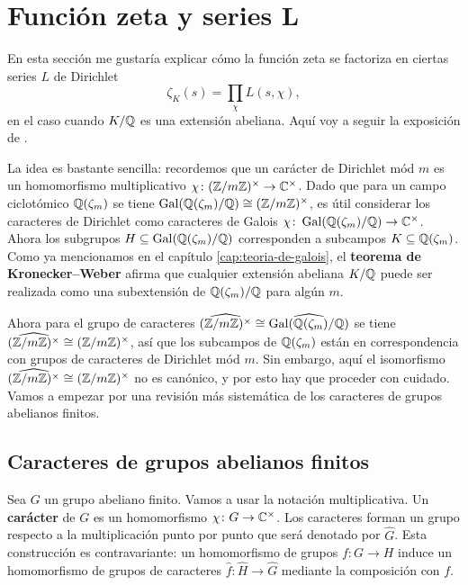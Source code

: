 \section{Función zeta y series L}

En esta sección me gustaría explicar cómo la función zeta se factoriza en
ciertas series $L$ de Dirichlet
$$\zeta_K (s) = \prod_\chi L(s,\chi),$$
en el caso cuando $K/\mathbb{Q}$ es una extensión abeliana. Aquí voy a seguir la
exposición de \cite{Washington-GTM83}.

La idea es bastante sencilla: recordemos que un carácter de Dirichlet mód $m$
es un homomorfismo multiplicativo
$\chi\colon (\mathbb{Z}/m\mathbb{Z})^\times \to \mathbb{C}^\times$. Dado que para un campo ciclotómico
$\mathbb{Q} (\zeta_m)$ se tiene $\operatorname{Gal} (\mathbb{Q}(\zeta_m)/\mathbb{Q}) \cong (\mathbb{Z}/m\mathbb{Z})^\times$,
es útil considerar los caracteres de Dirichlet como caracteres de Galois
$\chi\colon \operatorname{Gal} (\mathbb{Q}(\zeta_m)/\mathbb{Q}) \to \mathbb{C}^\times$. Ahora los subgrupos
$H \subseteq \operatorname{Gal} (\mathbb{Q}(\zeta_m)/\mathbb{Q})$ corresponden a subcampos
$K \subseteq \mathbb{Q} (\zeta_m)$. Como ya mencionamos en el capítulo
\ref{cap:teoria-de-galois}, el \textbf{teorema de Kronecker--Weber} afirma que
cualquier extensión abeliana $K/\mathbb{Q}$ puede ser realizada como una subextensión
de $\mathbb{Q} (\zeta_m)/\mathbb{Q}$ para algún $m$.

Ahora para el grupo de caracteres
$\widehat{(\mathbb{Z}/m\mathbb{Z})^\times} \cong \widehat{\operatorname{Gal} (\mathbb{Q}(\zeta_m)/\mathbb{Q})}$ se tiene
$\widehat{(\mathbb{Z}/m\mathbb{Z})^\times} \cong (\mathbb{Z}/m\mathbb{Z})^\times$, así que los subcampos
de $\mathbb{Q} (\zeta_m)$ están en correspondencia con grupos de caracteres de
Dirichlet mód $m$. Sin embargo, aquí el isomorfismo
$\widehat{(\mathbb{Z}/m\mathbb{Z})^\times} \cong (\mathbb{Z}/m\mathbb{Z})^\times$ no es canónico, y por esto
hay que proceder con cuidado. Vamos a empezar por una revisión más
sistemática de los caracteres de grupos abelianos finitos.


\subsection{Caracteres de grupos abelianos finitos}

Sea $G$ un grupo abeliano finito. Vamos a usar la notación multiplicativa.
Un \textbf{carácter} de $G$ es un homomorfismo $\chi\colon G\to \mathbb{C}^\times$.
Los caracteres forman un grupo respecto a la multiplicación punto por punto
que será denotado por $\widehat{G}$. Esta construcción es contravariante:
un homomorfismo de grupos $f\colon G\to H$ induce un homomorfismo de grupos
de caracteres $\widehat{f}\colon \widehat{H} \to \widehat{G}$ mediante la
composición con $f$.


